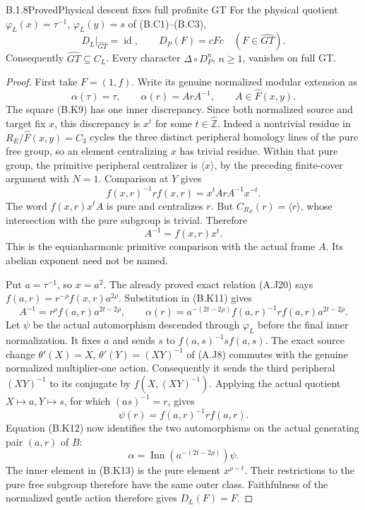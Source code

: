 \begin{result}{B.1.8}{Proved}{Physical descent fixes full profinite GT}
For the physical quotient $\varphi_L(x)=\tau^{-1}$,
$\varphi_L(y)=s$ of (B.C1)--(B.C3),
\[
             D_L|_{\widehat{GT}}=\operatorname{id},
 \qquad D_P(F)=cFc\quad(F\in\widehat{GT}).               \tag{B.K10}
\]
Consequently $\widehat{GT}\subseteq C_L$.  Every character
$\Delta\circ D_P^n$, $n\geq1$, vanishes on full GT.
\end{result}
\begin{proof}
First take $F=(1,f)$.  Write its genuine normalized modular
extension as
\[
 \alpha(\tau)=\tau,\qquad \alpha(r)=A rA^{-1},\qquad A\in\widehat F(x,y).
\]
The square (B.K9) has one inner discrepancy.  Since both
normalized source and target fix $x$, this discrepancy is
$x^t$ for some $t\in\widehat{\mathbb Z}$.  Indeed a nontrivial
residue in $R_E/\widehat F(x,y)=C_3$ cycles the three distinct
peripheral homology lines of the pure free group, so an element
centralizing $x$ has trivial residue.  Within that pure group,
the primitive peripheral centralizer is $\langle x\rangle$,
by the preceding finite-cover argument with $N=1$.
Comparison at $Y$ gives
\[
 f(x,r)^{-1}rf(x,r)=x^t A rA^{-1}x^{-t}.
\]
The word $f(x,r)x^tA$ is pure and centralizes $r$.
But $C_{R_E}(r)=\langle r\rangle$, whose intersection
with the pure subgroup is trivial.  Therefore
\[
                         A^{-1}=f(x,r)x^t.              \tag{B.K11}
\]
This is the equianharmonic primitive comparison with the
actual frame $A$.  Its abelian exponent need not be named.

Put $a=\tau^{-1}$, so $x=a^2$.  The already proved exact
relation (A.J20) says
$f(a,r)=r^{-\rho}f(x,r)a^{2\rho}$.
Substitution in (B.K11) gives
\[
 A^{-1}=r^\rho f(a,r)a^{2t-2\rho},\qquad
 \alpha(r)=a^{-(2t-2\rho)}f(a,r)^{-1}rf(a,r)a^{2t-2\rho}.
                                                               \tag{B.K12}
\]
Let $\psi$ be the actual automorphism descended through
$\varphi_L$ before the final inner normalization.  It fixes
$a$ and sends $s$ to $f(a,s)^{-1}s f(a,s)$.  The exact
source change $\theta'(X)=X$, $\theta'(Y)=(XY)^{-1}$ of
(A.J8) commutes with the genuine normalized multiplier-one
action.  Consequently it sends the third peripheral
$(XY)^{-1}$ to its conjugate by
$f(X,(XY)^{-1})$.  Applying the actual quotient
$X\mapsto a,Y\mapsto s$, for which $(as)^{-1}=r$, gives
\[
                         \psi(r)=f(a,r)^{-1}rf(a,r).
\]
Equation (B.K12) now identifies the two automorphisms on the
actual generating pair $(a,r)$ of $B$:
\[
                     \alpha=\operatorname{Inn}(a^{-(2t-2\rho)})\psi.
                                                               \tag{B.K13}
\]
The inner element in (B.K13) is the pure element
$x^{\rho-t}$.  Their restrictions to the pure free subgroup
therefore have the same outer class.  Faithfulness of the normalized gentle action
therefore gives $D_L(F)=F$.


\end{proof}
